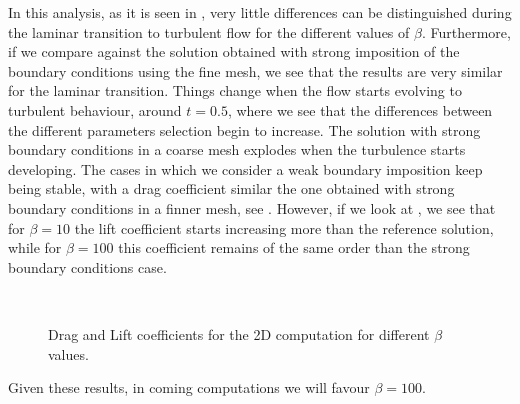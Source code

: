 In this analysis, as it is seen in , very little differences can be distinguished during the laminar transition to turbulent flow for the different values of $ \beta $. Furthermore, if we compare against the solution obtained with strong imposition of the boundary conditions using the fine mesh, we see that the results are very similar for the laminar transition. Things change when the flow starts evolving to turbulent behaviour, around $ t=0.5 $, where we see that the differences between the different parameters selection begin to increase. The solution with strong boundary conditions in a coarse mesh explodes when the turbulence starts developing. The cases in which we consider a weak boundary imposition keep being stable, with a drag coefficient similar the one obtained with strong boundary conditions in a finner mesh, see . However, if we look at , we see that for $ \beta=10 $ the lift coefficient starts increasing more than the reference solution, while for $ \beta=100 $ this coefficient remains of the same order than the strong boundary conditions case.
\begin{figure}[h!]
  \centering
  \\
  \caption{Drag and Lift coefficients for the 2D computation for different $ \beta $ values.}
  \label{fig-NACA_b_drag_lift}
\end{figure}
Given these results, in coming computations we will favour $ \beta=100 $.

